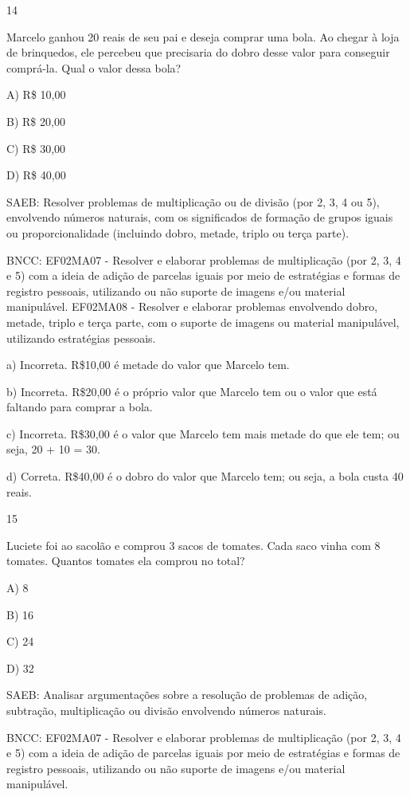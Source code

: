 \begin{escolha}
\begin{escolha}
{{{{\num{14}

Marcelo ganhou 20 reais de seu pai e deseja comprar uma bola. Ao chegar
à loja de brinquedos, ele percebeu que precisaria do dobro desse valor
para conseguir comprá-la. Qual o valor dessa bola?

A) R\$ 10,00

B) R\$ 20,00

C) R\$ 30,00

D) R\$ 40,00

SAEB: Resolver problemas de multiplicação ou de divisão (por 2,
3, 4 ou 5), envolvendo números naturais, com os significados de formação
de grupos iguais ou proporcionalidade (incluindo dobro, metade, triplo
ou terça parte).

BNCC: EF02MA07 - Resolver e elaborar problemas de multiplicação (por 2,
3, 4 e 5) com a ideia de adição de parcelas iguais por meio de
estratégias e formas de registro pessoais, utilizando ou não suporte de
imagens e/ou material manipulável. EF02MA08 - Resolver e elaborar
problemas envolvendo dobro, metade, triplo e terça parte, com o suporte
de imagens ou material manipulável, utilizando estratégias pessoais.

a) Incorreta. R\$10,00 é metade do valor que Marcelo tem.

b) Incorreta. R\$20,00 é o próprio valor que Marcelo tem ou o valor que
está faltando para comprar a bola.

c) Incorreta. R\$30,00 é o valor que Marcelo tem mais metade do que ele
tem; ou seja, 20 + 10 = 30.

d) Correta. R\$40,00 é o dobro do valor que Marcelo tem; ou seja, a bola
custa 40 reais.

\num{15}

Luciete foi ao sacolão e comprou 3 sacos de tomates. Cada saco vinha com
8 tomates. Quantos tomates ela comprou no total?

A) 8

B) 16

C) 24

D) 32

SAEB: Analisar argumentações sobre a resolução de problemas de
adição, subtração, multiplicação ou divisão envolvendo números naturais.

BNCC: EF02MA07 - Resolver e elaborar problemas de multiplicação (por 2,
3, 4 e 5) com a ideia de adição de parcelas iguais por meio de
estratégias e formas de registro pessoais, utilizando ou não suporte de
imagens e/ou material manipulável.

}}}}
\end{escolha}
\end{escolha}
